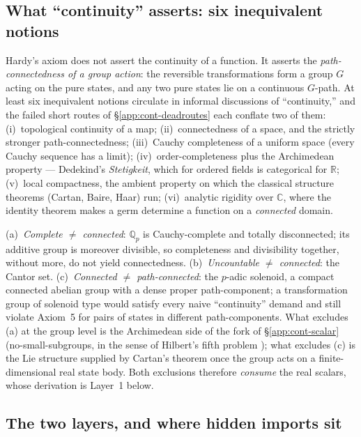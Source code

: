 \subsection{What ``continuity'' asserts: six inequivalent notions}
\label{app:cont-ladder}

Hardy's axiom does not assert the continuity of a function. It asserts the
\emph{path-connectedness of a group action}: the reversible transformations form a group
$G$ acting on the pure states, and any two pure states lie on a continuous $G$-path. At
least six inequivalent notions circulate in informal discussions of ``continuity,'' and
the failed short routes of \S\ref{app:cont-deadroutes} each conflate two of them:
(i)~topological continuity of a map; (ii)~connectedness of a space, and the strictly
stronger path-connectedness; (iii)~Cauchy completeness of a uniform space (every Cauchy
sequence has a limit); (iv)~order-completeness plus the Archimedean property --- Dedekind's
\emph{Stetigkeit}, which for ordered fields is categorical for $\mathbb{R}$;
(v)~local compactness, the ambient property on which the classical structure theorems
(Cartan, Baire, Haar) run; (vi)~analytic rigidity over $\mathbb{C}$, where the identity
theorem makes a germ determine a function on a \emph{connected} domain.

\begin{remark}\label{rem:witnesses}
(a)~\emph{Complete $\neq$ connected}: $\mathbb{Q}_p$ is Cauchy-complete and totally
disconnected; its additive group is moreover divisible, so completeness and divisibility
together, without more, do not yield connectedness.
(b)~\emph{Uncountable $\neq$ connected}: the Cantor set.
(c)~\emph{Connected $\neq$ path-connected}: the $p$-adic solenoid, a compact connected
abelian group with a dense proper path-component; a transformation group of solenoid type
would satisfy every naive ``continuity'' demand and still violate Axiom~5 for pairs of
states in different path-components. What excludes (a) at the group level is the
Archimedean side of the fork of \S\ref{app:cont-scalar} (no-small-subgroups, in the sense
of Hilbert's fifth problem \cite{gleason1952, montgomeryzippin}); what excludes (c) is
the Lie structure supplied by Cartan's theorem once the group acts on a finite-dimensional
real state body. Both exclusions therefore \emph{consume} the real scalars, whose
derivation is Layer~1 below.
\end{remark}

\subsection{The two layers, and where hidden imports sit}
\label{app:cont-layers}

